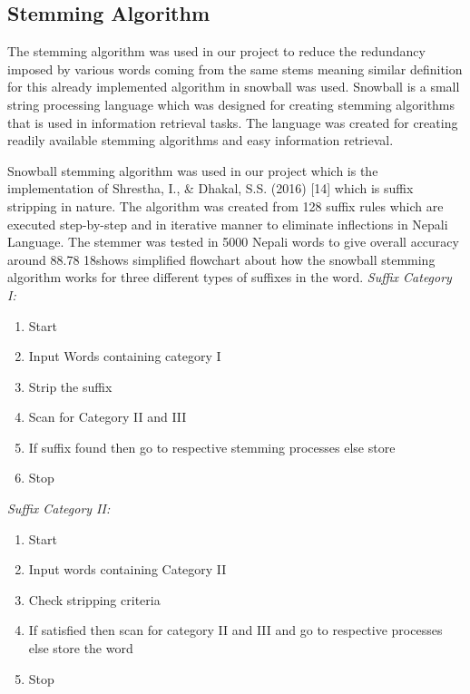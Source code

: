                 \subsection{Stemming Algorithm}
The stemming algorithm was used in our project to reduce the redundancy imposed by
various words coming from the same stems meaning similar definition for this already
implemented algorithm in snowball was used. Snowball is a small string processing
language which was designed for creating stemming algorithms that is used in
information retrieval tasks. The language was created for creating readily available
stemming algorithms and easy information retrieval.

Snowball stemming algorithm was used in our project which is the implementation of
Shrestha, I., & Dhakal, S.S. (2016) [14] which is suffix stripping in nature. The algorithm
was created from 128 suffix rules which are executed step-by-step and in iterative
manner to eliminate inflections in Nepali Language. The stemmer was tested in 5000
Nepali words to give overall accuracy around 88.78%
18shows simplified flowchart about how the snowball stemming algorithm works for
three different types of suffixes in the word.
            \textit{Suffix Category I:}
            \begin{enumerate}
                \item Start
                \item Input Words containing category I
                \item Strip the suffix
                \item Scan for Category II and III
                \item If suffix found then go to respective stemming processes else store
                \item Stop
            \end{enumerate}
            \textit{Suffix Category II:}
            \begin{enumerate}
                \item Start
                \item Input words containing Category II
                \item Check stripping criteria
                \item If satisfied then scan for category II and III and go to respective processes else store the word
                \item Stop
            \end{enumerate}
            
